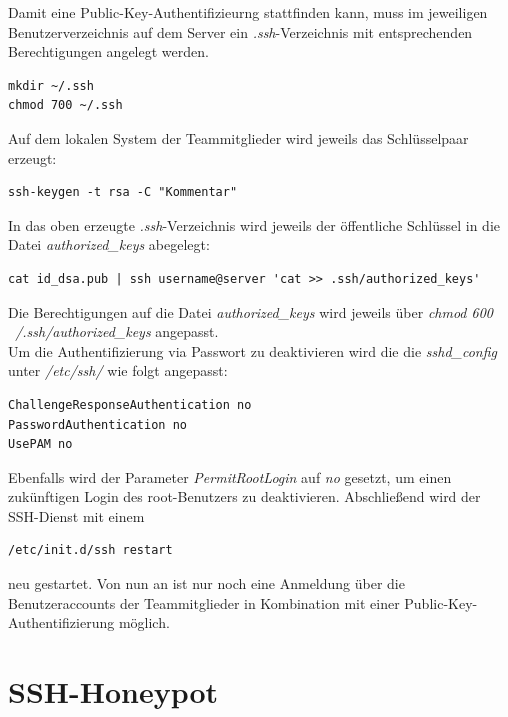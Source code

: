 Damit eine Public-Key-Authentifizieurng stattfinden kann, muss im jeweiligen Benutzerverzeichnis auf dem Server ein \textit{.ssh}-Verzeichnis mit entsprechenden Berechtigungen angelegt werden.

\begin{lstlisting}[style=customc]
mkdir ~/.ssh
chmod 700 ~/.ssh
\end{lstlisting}

Auf dem lokalen System der Teammitglieder wird jeweils das Schlüsselpaar erzeugt:

\begin{lstlisting}[style=customc]
ssh-keygen -t rsa -C "Kommentar"
\end{lstlisting}

In das oben erzeugte \textit{.ssh}-Verzeichnis wird jeweils der öffentliche Schlüssel in die Datei \textit{authorized\_keys} abegelegt:

\begin{lstlisting}[style=customc]
cat id_dsa.pub | ssh username@server 'cat >> .ssh/authorized_keys'
\end{lstlisting}

Die Berechtigungen auf die Datei \textit{authorized\_keys} wird jeweils über \textit{chmod 600 ~/.ssh/authorized\_keys} angepasst.\\

Um die Authentifizierung via Passwort zu deaktivieren wird die die \textit{sshd\_config} unter \textit{/etc/ssh/} wie folgt angepasst:

\begin{lstlisting}[style=customc]
ChallengeResponseAuthentication no
PasswordAuthentication no
UsePAM no
\end{lstlisting}

Ebenfalls wird der Parameter \textit{PermitRootLogin} auf \textit{no} gesetzt, um einen zukünftigen Login des root-Benutzers zu deaktivieren. Abschließend wird der SSH-Dienst mit einem

\begin{lstlisting}[style=customc]
/etc/init.d/ssh restart
\end{lstlisting}

neu gestartet. Von nun an ist nur noch eine Anmeldung über die Benutzeraccounts der Teammitglieder in Kombination mit einer Public-Key-Authentifizierung möglich.

\section{SSH-Honeypot}
\label{sec:SSH-Honeypot}

